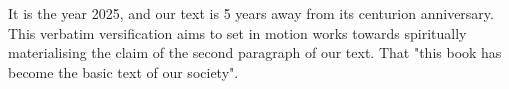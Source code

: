 \begin{fmatterchapter}
It is the year 2025, and our text is 5 years away 
    from its centurion anniversary.
This verbatim versification aims to set in motion works towards 
    spiritually materialising the claim 
    of the second paragraph of our text.
That "this book has become the basic text of our society".





\end{fmatterchapter}
